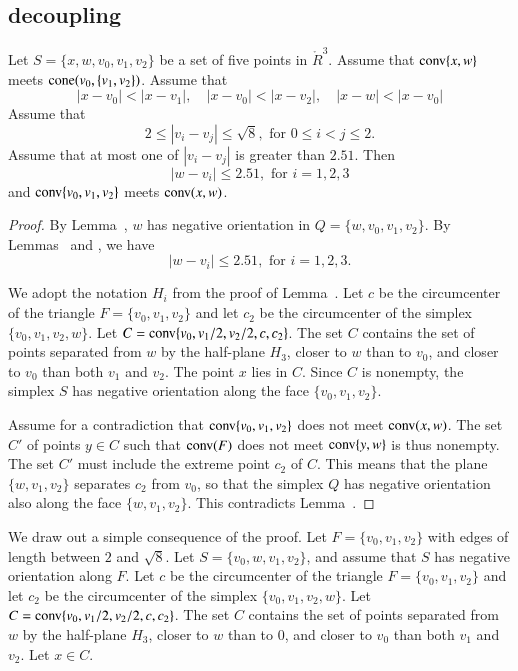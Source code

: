 \newpage


\subsection{decoupling}



\begin{lemma}
Let $S=\{x,w,v_0,v_1,v_2\}$ be a set of five points
in $\ring{R}^3$.  Assume that
  ${\operatorname{conv}}\{x,w\}$ meets ${\operatorname{cone}}(v_0,\{v_1,v_2\})$.  
Assume that
  $$
  |x-v_0| < |x-v_1|,\quad 
  |x-v_0| < |x-v_2|,\quad
  |x-w| < |x-v_0|
  $$
Assume that 
  $$
  2\le |v_i-v_j|\le \sqrt{8}, \text{ for } 0\le i < j \le 2.
  $$
Assume that at most one of $|v_i-v_j|$ is greater than $2.51$.
Then
  $$|w-v_i|\le 2.51,\text{ for } i=1,2,3$$
and ${\operatorname{conv}}\{v_0,v_1,v_2\}$ meets ${\operatorname{conv}}(x,w)$.
\end{lemma}


\begin{proof}
By Lemma~, $w$ has negative orientation
in $Q=\{w,v_0,v_1,v_2\}$.
By
Lemmas~ and ,
we have
  $$|w-v_i|\le 2.51,\text{ for } i=1,2,3.$$

We adopt the notation $H_i$ from the proof of
Lemma~.
Let $c$ be the circumcenter of the triangle $F=\{v_0,v_1,v_2\}$ and
let $c_2$ be the circumcenter of the simplex $\{v_0,v_1,v_2,w\}$.
Let $C={\operatorname{conv}}\{v_0,v_1/2,v_2/2,c,c_2\}$.  The set
$C$ contains the set of points separated from $w$ by the
half-plane $H_3$, closer to $w$ than to $v_0$, and closer to $v_0$
than both $v_1$ and $v_2$. The point $x$ lies in
$C$. Since $C$ is nonempty, the simplex $S$ has
negative orientation along the face $\{v_0,v_1,v_2\}$.

Assume for a contradiction that ${\operatorname{conv}}\{v_0,v_1,v_2\}$
does not meet ${\operatorname{conv}}(x,w)$.
The set $C'$ of points $y\in C$ such that 
  ${\operatorname{conv}}(F)$ does not meet ${\operatorname{conv}}\{y,w\}$ is thus
nonempty. The set $C'$ must include the extreme point $c_2$ of
$C$. This means that the plane $\{w,v_1,v_2\}$ separates $c_2$
from $v_0$, so that the simplex $Q$ has negative orientation
also along the face $\{w,v_1,v_2\}$.  This contradicts
Lemma~.
\end{proof}


We draw out a simple consequence of the proof.
Let
$F=\{v_0,v_1,v_2\}$ with edges of length between $2$ and $\sqrt8$.
Let $S=\{v_0,w,v_1,v_2\}$, and assume that $S$ has negative
orientation along $F$. Let $c$ be the circumcenter of the triangle
$F=\{v_0,v_1,v_2\}$ and let $c_2$ be the circumcenter of the simplex
$\{v_0,v_1,v_2,w\}$. Let
$C={\operatorname{conv}}\{v_0,v_1/2,v_2/2,c,c_2\}$.  The set $C$ contains the set of points
separated from $w$ by the half-plane $H_3$, closer to $w$ than to
$0$, and closer to $v_0$ than both $v_1$ and $v_2$. Let $x\in C$.


